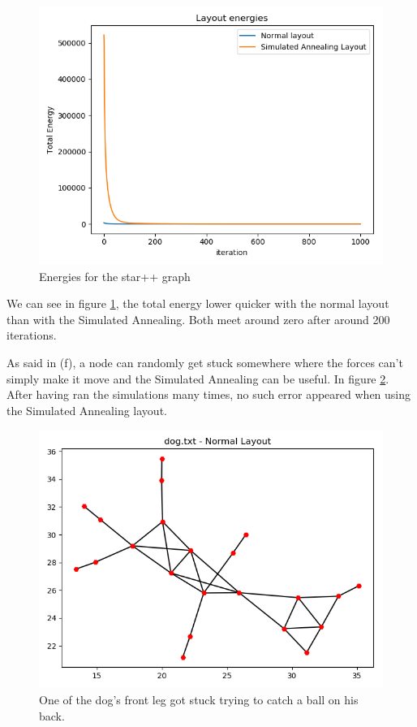 \documentclass[10pt,a4paper]{article}
\begin{document}
\begin{enumerate}
\begin{figure}[H]
	\centering
	\includegraphics[width=0.7\linewidth]{../Scripts/star++_energies}
	\caption{Energies for the star++ graph}
	\label{fig:starenergies}
\end{figure}

We can see in figure \ref{fig:starenergies}, the total energy lower quicker with the normal layout than with the Simulated Annealing. Both meet around zero after around 200 iterations. 


As said in (f), a node can randomly get stuck somewhere where the forces can't simply make it move and the Simulated Annealing can be useful. In figure \ref{fig:dognormalerror}. After having ran the simulations many times, no such error appeared when using the Simulated Annealing layout. 

\begin{figure}[H]
	\centering
	\includegraphics[width=0.7\linewidth]{../Scripts/dog_normal_error}
	\caption{One of the dog's front leg got stuck trying to catch a ball on his back. }
	\label{fig:dognormalerror}
\end{figure}





\end{enumerate}
\end{document}

